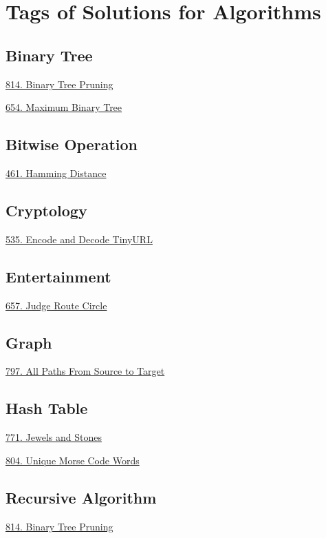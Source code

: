 \tocless\section{Tags of Solutions for Algorithms}
\label{sec:algo_tag}

\subsection*{Binary Tree}
\begin{flushleft}
    \hyperref[algo:814]{814. Binary Tree Pruning}

    \hyperref[algo:654]{654. Maximum Binary Tree}
\end{flushleft}

\subsection*{Bitwise Operation}
\begin{flushleft}
    \hyperref[algo:461]{461. Hamming Distance}
\end{flushleft}

\subsection*{Cryptology}
\begin{flushleft}
    \hyperref[algo:535]{535. Encode and Decode TinyURL}
\end{flushleft}

\subsection*{Entertainment}
\begin{flushleft}
    \hyperref[algo:657]{657. Judge Route Circle}
\end{flushleft}

\subsection*{Graph}
\begin{flushleft}
    \hyperref[algo:797]{797. All Paths From Source to Target}
\end{flushleft}

\subsection*{Hash Table}
\begin{flushleft}
    \hyperref[algo:771]{771. Jewels and Stones}
    
    \hyperref[algo:804]{804. Unique Morse Code Words}
\end{flushleft}

\subsection*{Recursive Algorithm}
\begin{flushleft}
    \hyperref[algo:814]{814. Binary Tree Pruning}
\end{flushleft}
